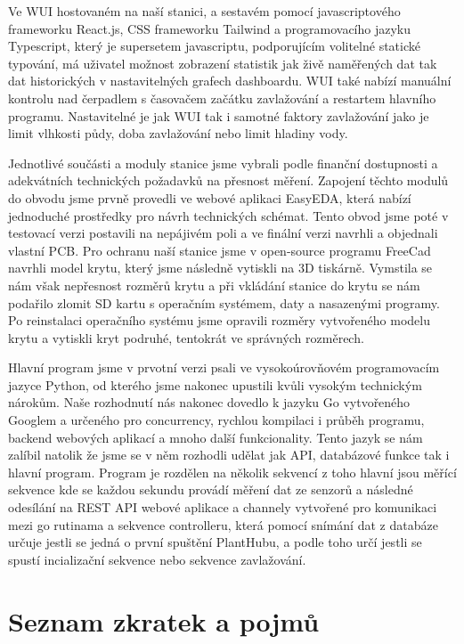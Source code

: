 \documentclass[12pt,a4paper]{article}
\begin{document}
Ve \ac{WUI} hostovaném na naší stanici, a sestavém pomocí javascriptového
frameworku
React.js, CSS frameworku
Tailwind a programovacího jazyku Typescript, který je supersetem javascriptu,
podporujícím volitelné statické typování, má uživatel
možnost zobrazení statistik jak živě naměřených dat tak dat historických v
nastavitelných grafech dashboardu. \ac{WUI} také nabízí manuální kontrolu nad
čerpadlem s časovačem začátku zavlažování a restartem hlavního programu.
Nastavitelné je jak \ac{WUI} tak i samotné faktory zavlažování jako je limit
vlhkosti
půdy, doba zavlažování nebo limit hladiny vody.

Jednotlivé součásti a moduly stanice jsme vybrali podle finanční dostupnosti a
adekvátních technických
požadavků na přesnost měření.
Zapojení těchto modulů do obvodu jsme prvně provedli ve webové aplikaci
EasyEDA, která nabízí jednoduché prostředky pro návrh technických
schémat. Tento obvod jsme poté v testovací verzi postavili na nepájivém
poli a ve finální verzi navrhli a objednali vlastní \ac{PCB}. Pro ochranu naší
stanice jsme v open-source programu FreeCad navrhli model krytu, který jsme
následně vytiskli na 3D tiskárně. Vymstila se nám však nepřesnost rozměrů krytu
a při vkládání stanice do krytu se nám podařilo zlomit SD kartu s operačním
systémem, daty a nasazenými programy. Po reinstalaci operačního systému jsme
opravili rozměry vytvořeného modelu krytu a
vytiskli kryt podruhé, tentokrát ve správných rozměrech.

Hlavní program jsme v prvotní verzi psali ve vysokoúrovňovém programovacím
jazyce Python, od kterého jsme nakonec upustili kvůli vysokým technickým
nárokům. Naše rozhodnutí nás nakonec dovedlo k jazyku
Go vytvořeného Googlem a určeného pro concurrency, rychlou kompilaci i průběh
programu, backend webových aplikací a mnoho
další funkcionality. Tento jazyk se nám zalíbil natolik že jsme se v něm
rozhodli
udělat jak \ac{API},
databázové funkce tak i hlavní program. Program je rozdělen na několik sekvencí
z toho hlavní jsou měřící sekvence kde se každou sekundu provádí měření dat ze
senzorů a následné odesílání na \ac{REST} \ac{API} webové aplikace a channely
vytvořené
pro komunikaci mezi go rutinama a sekvence controlleru, která pomocí snímání
dat z databáze určuje jestli se jedná o první spuštění PlantHubu, a podle toho
určí jestli se spustí incializační sekvence nebo sekvence zavlažování.

\clearpage

\section{Seznam zkratek a pojmů}
\end{document}
